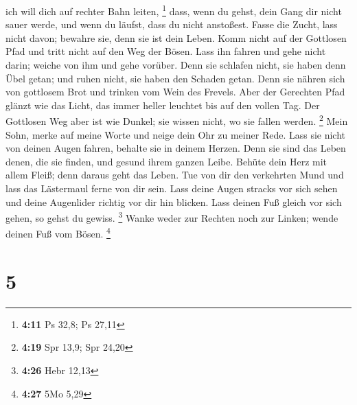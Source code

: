 ich will dich auf rechter Bahn leiten, \footnote{\textbf{4:11} Ps 32,8;
  Ps 27,11}  dass, wenn du gehst, dein Gang dir nicht
sauer werde, und wenn du läufst, dass du nicht anstoßest.
 Fasse die Zucht, lass nicht davon; bewahre sie, denn sie
ist dein Leben.  Komm nicht auf der Gottlosen Pfad und
tritt nicht auf den Weg der Bösen.  Lass ihn fahren und
gehe nicht darin; weiche von ihm und gehe vorüber.  Denn
sie schlafen nicht, sie haben denn Übel getan; und ruhen nicht, sie
haben den Schaden getan.  Denn sie nähren sich von
gottlosem Brot und trinken vom Wein des Frevels.  Aber
der Gerechten Pfad glänzt wie das Licht, das immer heller leuchtet bis
auf den vollen Tag.  Der Gottlosen Weg aber ist wie
Dunkel; sie wissen nicht, wo sie fallen werden. \footnote{\textbf{4:19}
  Spr 13,9; Spr 24,20}  Mein Sohn, merke auf meine Worte
und neige dein Ohr zu meiner Rede.  Lass sie nicht von
deinen Augen fahren, behalte sie in deinem Herzen.  Denn
sie sind das Leben denen, die sie finden, und gesund ihrem ganzen Leibe.
 Behüte dein Herz mit allem Fleiß; denn daraus geht das
Leben.  Tue von dir den verkehrten Mund und lass das
Lästermaul ferne von dir sein.  Lass deine Augen stracks
vor sich sehen und deine Augenlider richtig vor dir hin blicken.
 Lass deinen Fuß gleich vor sich gehen, so gehst du
gewiss. \footnote{\textbf{4:26} Hebr 12,13}  Wanke weder
zur Rechten noch zur Linken; wende deinen Fuß vom Bösen. \footnote{\textbf{4:27}
  5Mo 5,29}

\hypertarget{section-3}{%
\section{5}\label{section-3}}

